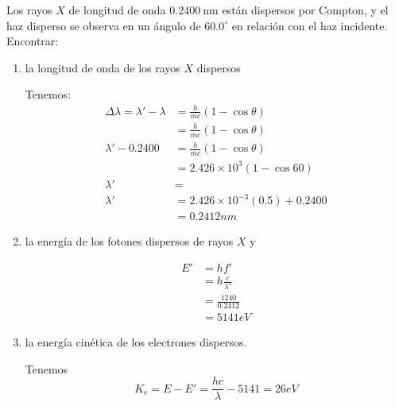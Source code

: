 




\begin{problema}[Problema 1] Los rayos $X$ de longitud de onda $0.2400 \mathrm{~nm}$ están dispersos por Compton, y el haz disperso se observa en un ángulo de $60.0^{\circ}$ en relación con el haz incidente. Encontrar: 
    \begin{enumerate}
        \item la longitud de onda de los rayos $X$ dispersos
        \begin{sol}
            Tenemos: 
            \begin{align*}
                \Delta\lambda =\lambda'-\lambda &=\frac{h}{mc}\left(1-\cos\theta\right)\\
                &=\frac{h}{mc}\left(1-\cos\theta\right)\\
                \lambda'-0.2400 &=\frac{h}{mc}\left(1-\cos\theta\right)\\
                &= 2.426 \times 10^3\left(1-\cos60\right)\\
                \lambda' &= \\
                \lambda' &= 2.426\times 10^{-3}(0.5)+0.2400\\
                &= 0.2412 nm
            \end{align*}
        \end{sol}
        \item la energía de los fotones dispersos de rayos $X$ y 
        \begin{sol}
            \begin{align*}
                E'&=hf'\\
                 &=h\frac{c}{\lambda'}\\
                 &= \frac{1240}{0.2412} \\
                 &= 5141 eV
            \end{align*}
        \end{sol}
        \item la energía cinética de los electrones dispersos.
        \begin{sol}
            Tenemos
            $$K_e=E-E'=\frac{hc}{\lambda} - 5141 = 26eV$$
        \end{sol}
    \end{enumerate}
    
    

\end{problema}
